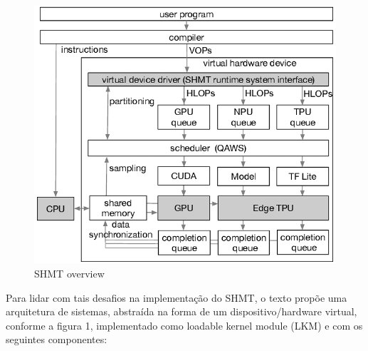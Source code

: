 \documentclass{article}
\begin{document}
\begin{figure}
    \centering
    \includegraphics{micro23-41-fig3.jpg}
    \caption{SHMT overview}
    \label{fig:enter-label}
\end{figure}

Para lidar com tais desafios na implementação do SHMT, o texto propõe uma arquitetura de sistemas, abstraída na forma de um dispositivo/hardware virtual, conforme a figura 1, implementado como loadable kernel module (LKM) e com os seguintes componentes:
\end{document}
